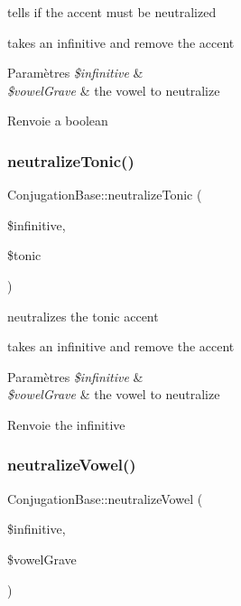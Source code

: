 tells if the accent must be neutralized 

takes an infinitive and remove the accent


\begin{DoxyParams}{Paramètres}
{\em \$infinitive} & \\
\hline
{\em \$vowel\+Grave} & the vowel to neutralize \\
\hline
\end{DoxyParams}
\begin{DoxyReturn}{Renvoie}
a boolean 
\end{DoxyReturn}
\hypertarget{classConjugationBase_a4fa62e858acfcf5eb83c11645687690c}{}\label{classConjugationBase_a4fa62e858acfcf5eb83c11645687690c} 
\subsubsection{\texorpdfstring{neutralize\+Tonic()}{neutralizeTonic()}}
{\footnotesize\ttfamily Conjugation\+Base\+::neutralize\+Tonic (\begin{DoxyParamCaption}\item[{}]{\$infinitive,  }\item[{}]{\$tonic }\end{DoxyParamCaption})\hspace{0.3cm}{\ttfamily [protected]}}



neutralizes the tonic accent 

takes an infinitive and remove the accent


\begin{DoxyParams}{Paramètres}
{\em \$infinitive} & \\
\hline
{\em \$vowel\+Grave} & the vowel to neutralize \\
\hline
\end{DoxyParams}
\begin{DoxyReturn}{Renvoie}
the infinitive 
\end{DoxyReturn}
\hypertarget{classConjugationBase_a7d66d915461d677c63117166cb85e813}{}\label{classConjugationBase_a7d66d915461d677c63117166cb85e813} 
\subsubsection{\texorpdfstring{neutralize\+Vowel()}{neutralizeVowel()}}
{\footnotesize\ttfamily Conjugation\+Base\+::neutralize\+Vowel (\begin{DoxyParamCaption}\item[{}]{\$infinitive,  }\item[{}]{\$vowel\+Grave }\end{DoxyParamCaption})\hspace{0.3cm}{\ttfamily [protected]}}



